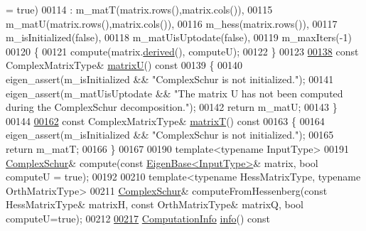 \begin{DoxyCode}
       = \textcolor{keyword}{true})
00114       : m\_matT(matrix.rows(),matrix.cols()),
00115         m\_matU(matrix.rows(),matrix.cols()),
00116         m\_hess(matrix.rows()),
00117         m\_isInitialized(false),
00118         m\_matUisUptodate(false),
00119         m\_maxIters(-1)
00120     \{
00121       compute(matrix.\hyperlink{group___core___module_a324b16961a11d2ecfd2d1b7dd7946545}{derived}(), computeU);
00122     \}
00123 
\hyperlink{group___eigenvalues___module_afed8177cf9836f032d42bdb6c6bc6e01}{00138}     \textcolor{keyword}{const} ComplexMatrixType& \hyperlink{group___eigenvalues___module_afed8177cf9836f032d42bdb6c6bc6e01}{matrixU}()\textcolor{keyword}{ const}
00139 \textcolor{keyword}{    }\{
00140       eigen\_assert(m\_isInitialized && \textcolor{stringliteral}{"ComplexSchur is not initialized."});
00141       eigen\_assert(m\_matUisUptodate && \textcolor{stringliteral}{"The matrix U has not been computed during the ComplexSchur
       decomposition."});
00142       \textcolor{keywordflow}{return} m\_matU;
00143     \}
00144 
\hyperlink{group___eigenvalues___module_add3ab5ed83f7f2f06b79fa910a2d5684}{00162}     \textcolor{keyword}{const} ComplexMatrixType& \hyperlink{group___eigenvalues___module_add3ab5ed83f7f2f06b79fa910a2d5684}{matrixT}()\textcolor{keyword}{ const}
00163 \textcolor{keyword}{    }\{
00164       eigen\_assert(m\_isInitialized && \textcolor{stringliteral}{"ComplexSchur is not initialized."});
00165       \textcolor{keywordflow}{return} m\_matT;
00166     \}
00167 
00190     \textcolor{keyword}{template}<\textcolor{keyword}{typename} InputType>
00191     \hyperlink{group___eigenvalues___module_class_eigen_1_1_complex_schur}{ComplexSchur}& compute(\textcolor{keyword}{const} \hyperlink{group___core___module_struct_eigen_1_1_eigen_base}{EigenBase<InputType>}& matrix, \textcolor{keywordtype}{bool} computeU
       = \textcolor{keyword}{true});
00192     
00210     \textcolor{keyword}{template}<\textcolor{keyword}{typename} HessMatrixType, \textcolor{keyword}{typename} OrthMatrixType>
00211     \hyperlink{group___eigenvalues___module_class_eigen_1_1_complex_schur}{ComplexSchur}& computeFromHessenberg(\textcolor{keyword}{const} HessMatrixType& matrixH, \textcolor{keyword}{const} OrthMatrixType& 
      matrixQ,  \textcolor{keywordtype}{bool} computeU=\textcolor{keyword}{true});
00212 
\hyperlink{group___eigenvalues___module_a8c5ee15fecfd126fc362c3f2fd28f51e}{00217}     \hyperlink{group__enums_ga85fad7b87587764e5cf6b513a9e0ee5e}{ComputationInfo} \hyperlink{group___eigenvalues___module_a8c5ee15fecfd126fc362c3f2fd28f51e}{info}()\textcolor{keyword}{ const}

\end{DoxyCode}
